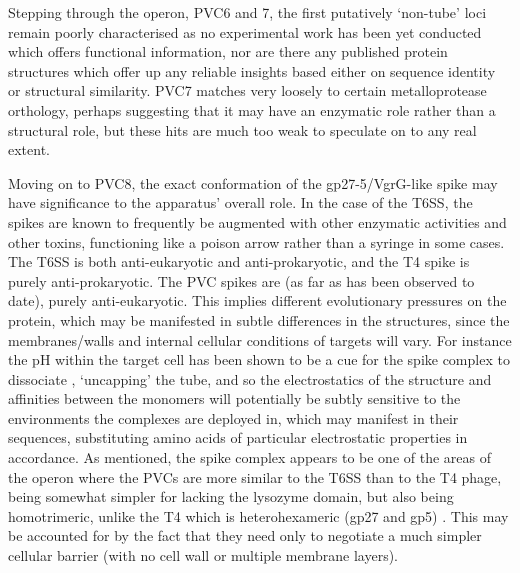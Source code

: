 Stepping through the operon, PVC6 and 7, the first putatively `non-tube' loci remain poorly characterised as no experimental work has been yet conducted which offers functional information, nor are there any published protein structures which offer up any reliable insights based either on sequence identity or structural similarity. PVC7 matches very loosely to certain metalloprotease orthology, perhaps suggesting that it may have an enzymatic role rather than a structural role, but these hits are much too weak to speculate on to any real extent.

Moving on to PVC8, the exact conformation of the gp27-5/VgrG-like spike may have significance to the apparatus' overall role. In the case of the T6SS, the spikes are known to frequently be augmented with other enzymatic activities and other toxins, functioning like a poison arrow rather than a syringe in some cases. The T6SS is both anti-eukaryotic and anti-prokaryotic, and the T4 spike is purely anti-prokaryotic. The PVC spikes are (as far as has been observed to date), purely anti-eukaryotic. This implies different evolutionary pressures on the protein, which may be manifested in subtle differences in the structures, since the membranes/walls and internal cellular conditions of targets will vary. For instance the pH within the target cell has been shown to be a cue for the spike complex to dissociate \citep{KumarSarkar2006}, `uncapping' the tube, and so the electrostatics of the structure and affinities between the monomers will potentially be subtly sensitive to the environments the complexes are deployed in, which may manifest in their sequences, substituting amino acids of particular electrostatic properties in accordance. As mentioned, the spike complex appears to be one of the areas of the operon where the PVCs are more similar to the T6SS than to the T4 phage, being somewhat simpler for lacking the lysozyme domain, but also being homotrimeric, unlike the T4 which is heterohexameric (gp27 and gp5) \citep{KumarSarkar2006, Arisaka2003}. This may be accounted for by the fact that they need only to negotiate a much simpler cellular barrier (with no cell wall or multiple membrane layers).

